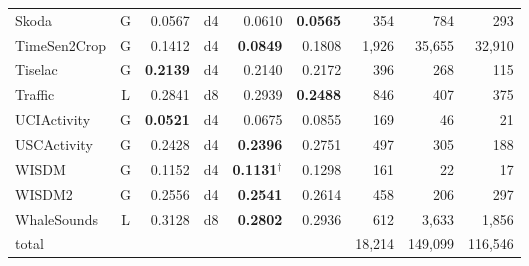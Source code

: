 \documentclass[a4paper, 11pt]{article}
\begin{document}
\begin{table}[tbp]
\begin{tabular}{lcrcrrrrr}
        Skoda                 & G                             & 0.0567                      & d4         & 0.0610                       & \textbf{0.0565} & 354    & 784     & 293     \\
        TimeSen2Crop          & G                             & 0.1412                      & d4         & \textbf{0.0849}              & 0.1808          & 1,926  & 35,655  & 32,910  \\
        Tiselac               & G                             & \textbf{0.2139}             & d4         & 0.2140                       & 0.2172          & 396    & 268     & 115     \\
        Traffic               & L                             & 0.2841                      & d8         & 0.2939                       & \textbf{0.2488} & 846    & 407     & 375     \\
        UCIActivity           & G                             & \textbf{0.0521}             & d4         & 0.0675                       & 0.0855          & 169    & 46      & 21      \\
        USCActivity           & G                             & 0.2428                      & d4         & \textbf{0.2396}              & 0.2751          & 497    & 305     & 188     \\
        WISDM                 & G                             & 0.1152                      & d4         & \textbf{0.1131}$^\dagger$    & 0.1298          & 161    & 22      & 17      \\
        WISDM2                & G                             & 0.2556                      & d4         & \textbf{0.2541}              & 0.2614          & 458    & 206     & 297     \\
        WhaleSounds           & L                             & 0.3128                      & d8         & \textbf{0.2802}              & 0.2936          & 612    & 3,633   & 1,856   \\
        \midrule
        total                 &                               &                             &            &                              &                 & 18,214 & 149,099 & 116,546 \\
        \bottomrule
    \end{tabular}
\end{table}
\end{document}
